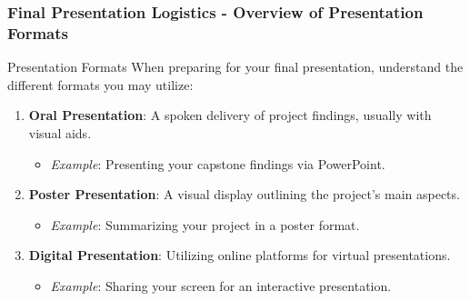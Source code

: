 \documentclass{beamer}
\begin{document}
\begin{frame}[fragile]
    \frametitle{Final Presentation Logistics - Overview of Presentation Formats}
    \begin{block}{Presentation Formats}
        When preparing for your final presentation, understand the different formats you may utilize:
    \end{block}
    \begin{enumerate}
        \item \textbf{Oral Presentation}: A spoken delivery of project findings, usually with visual aids.
            \begin{itemize}
                \item \textit{Example}: Presenting your capstone findings via PowerPoint.
            \end{itemize}
        \item \textbf{Poster Presentation}: A visual display outlining the project’s main aspects.
            \begin{itemize}
                \item \textit{Example}: Summarizing your project in a poster format.
            \end{itemize}
        \item \textbf{Digital Presentation}: Utilizing online platforms for virtual presentations.
            \begin{itemize}
                \item \textit{Example}: Sharing your screen for an interactive presentation.
            \end{itemize}
    \end{enumerate}
\end{frame}
\end{document}
